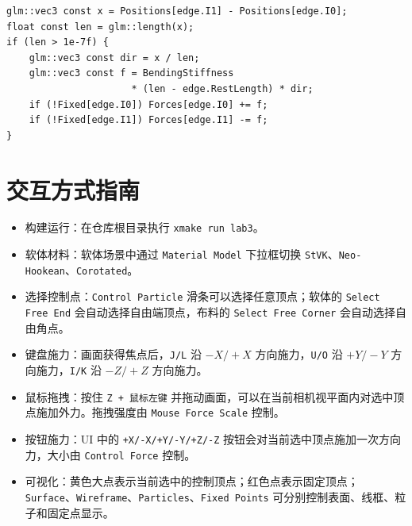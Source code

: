 \documentclass[UTF8,a4paper,11pt,fontset=fandol]{ctexart}
\begin{document}
\begin{lstlisting}[style=cppstyle,caption={布料弯曲弹簧}]
glm::vec3 const x = Positions[edge.I1] - Positions[edge.I0];
float const len = glm::length(x);
if (len > 1e-7f) {
    glm::vec3 const dir = x / len;
    glm::vec3 const f = BendingStiffness
                      * (len - edge.RestLength) * dir;
    if (!Fixed[edge.I0]) Forces[edge.I0] += f;
    if (!Fixed[edge.I1]) Forces[edge.I1] -= f;
}
\end{lstlisting}

\section{交互方式指南}

\begin{itemize}[leftmargin=*]
    \item 构建运行：在仓库根目录执行 \texttt{xmake run lab3}。
    \item 软体材料：软体场景中通过 \texttt{Material Model} 下拉框切换 \texttt{StVK}、\texttt{Neo-Hookean}、\texttt{Corotated}。
    \item 选择控制点：\texttt{Control Particle} 滑条可以选择任意顶点；软体的 \texttt{Select Free End} 会自动选择自由端顶点，布料的 \texttt{Select Free Corner} 会自动选择自由角点。
    \item 键盘施力：画面获得焦点后，\texttt{J/L} 沿 $-X/+X$ 方向施力，\texttt{U/O} 沿 $+Y/-Y$ 方向施力，\texttt{I/K} 沿 $-Z/+Z$ 方向施力。
    \item 鼠标拖拽：按住 \texttt{Z + 鼠标左键} 并拖动画面，可以在当前相机视平面内对选中顶点施加外力。拖拽强度由 \texttt{Mouse Force Scale} 控制。
    \item 按钮施力：UI 中的 \texttt{+X/-X/+Y/-Y/+Z/-Z} 按钮会对当前选中顶点施加一次方向力，大小由 \texttt{Control Force} 控制。
    \item 可视化：黄色大点表示当前选中的控制顶点；红色点表示固定顶点；\texttt{Surface}、\texttt{Wireframe}、\texttt{Particles}、\texttt{Fixed Points} 可分别控制表面、线框、粒子和固定点显示。
\end{itemize}
\end{document}

